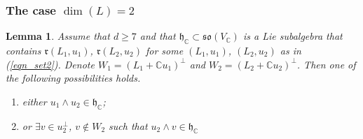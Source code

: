 \documentclass[11pt]{article}
\newcommand{\6}{\partial}
\newcommand{\bbC}{\mathbb{C}}
\newcommand{\frg}{\mathfrak{g}}
\newcommand{\frh}{\mathfrak{h}}
\newcommand{\frr}{\mathfrak{r}}
\newcommand{\frso}{\mathfrak{so}}
\renewcommand{\ge}{\geqslant}
\newcommand{\wdg}{\wedge}
\newtheorem{lem}[defn]{Lemma}
\begin{document}
\subsubsection{The case $\dim(L) = 2$}

\begin{lem}\label{lem_dim2}
Assume that $d\ge 7$ and that $\frh_\bbC\subset\frso(V_\bbC)$ is a Lie subalgebra
that contains $\frr(L_1,u_1)$, $\frr(L_2,u_2)$ for some $(L_1,u_1)$, $(L_2,u_2)$
as in (\ref{eqn_set2}).
Denote $W_1 = (L_1 + \bbC u_1)^\perp$ and $W_2 = (L_2 + \bbC u_2)^\perp$.
Then one of the following possibilities holds.
\begin{enumerate}
\item either $u_1\wdg u_2\in \frh_\bbC$;
\item or $\exists v\in u_2^\perp$, $v\notin W_2$ such that $u_2\wdg v\in \frh_\bbC$
\end{enumerate}
\end{lem}
\end{document}
